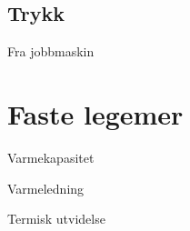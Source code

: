 \documentclass[a4paper,norsk,12pt]{article}
\begin{document}
\subsection{Trykk}
Fra jobbmaskin

\section{Faste legemer}
Varmekapasitet

Varmeledning

Termisk utvidelse
\end{document}
